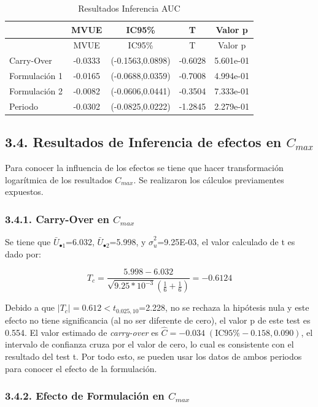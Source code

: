\documentclass[]{article}
\begin{document}
\begin{longtable}[]{@{}lcccc@{}}
\caption{Resultados Inferencia AUC}\tabularnewline
\toprule
& MVUE & IC95\% & T & Valor p\tabularnewline
\midrule
\endfirsthead
\toprule
& MVUE & IC95\% & T & Valor p\tabularnewline
\midrule
\endhead
Carry-Over & -0.0333 & (-0.1563,0.0898) & -0.6028 &
5.601e-01\tabularnewline
Formulación 1 & -0.0165 & (-0.0688,0.0359) & -0.7008 &
4.994e-01\tabularnewline
Formulación 2 & -0.0082 & (-0.0606,0.0441) & -0.3504 &
7.333e-01\tabularnewline
Periodo & -0.0302 & (-0.0825,0.0222) & -1.2845 &
2.279e-01\tabularnewline
\bottomrule
\end{longtable}

\subsection{\texorpdfstring{3.4. Resultados de Inferencia de efectos en
\(C_{max}\)}{3.4. Resultados de Inferencia de efectos en C\_\{max\}}}\label{resultados-de-inferencia-de-efectos-en-c_max}

Para conocer la influencia de los efectos se tiene que hacer
transformación logarítmica de los resultados \(C_{max}\). Se realizaron
los cálculos previamentes expuestos.

\subsubsection{\texorpdfstring{3.4.1. Carry-Over en
\(C_{max}\)}{3.4.1. Carry-Over en C\_\{max\}}}\label{carry-over-en-c_max}

Se tiene que \(\bar{U}_{\bullet1}\)=6.032, \(\bar{U}_{\bullet2}\)=5.998,
y \(\hat{\sigma}_{u}^{2}\)=9.25E-03, el valor calculado de t es dado
por:

\[T_{c}=\frac{5.998-6.032}{\sqrt{9.25*10^{-3}}\left(\frac{1}{6}+\frac{1}{6}\right)}=-0.6124\]

Debido a que \(\left|T_{c}\right|=0.612<t_{0.025,10}\)=2.228, no se
rechaza la hipótesis nula y este efecto no tiene significancia (al no
ser diferente de cero), el valor p de este test es 0.554. El valor
estimado de \emph{carry-over} es
\(\hat{C}=-0.034\;(\textrm{IC95}\%-0.158,0.090)\), el intervalo de
confianza cruza por el valor de cero, lo cual es consistente con el
resultado del test t. Por todo esto, se pueden usar los datos de ambos
periodos para conocer el efecto de la formulación.

\subsubsection{\texorpdfstring{3.4.2. Efecto de Formulación en
\(C_{max}\)}{3.4.2. Efecto de Formulación en C\_\{max\}}}\label{efecto-de-formulacion-en-c_max}
\end{document}
